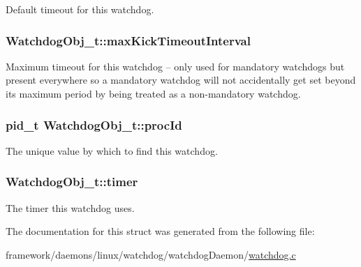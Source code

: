 Default timeout for this watchdog. 

\subsubsection[{\texorpdfstring{max\+Kick\+Timeout\+Interval}{maxKickTimeoutInterval}}]{ Watchdog\+Obj\+\_\+t\+::max\+Kick\+Timeout\+Interval}\hypertarget{struct_watchdog_obj__t_a29c8899fdeaff1aee8281bfc22765747}{}\label{struct_watchdog_obj__t_a29c8899fdeaff1aee8281bfc22765747}
Maximum timeout for this watchdog -- only used for mandatory watchdogs but present everywhere so a mandatory watchdog will not accidentally get set beyond it\textquotesingle{}s maximum period by being treated as a non-\/mandatory watchdog. 
\subsubsection[{\texorpdfstring{proc\+Id}{procId}}]{\setlength{\rightskip}{0pt plus 5cm}pid\+\_\+t Watchdog\+Obj\+\_\+t\+::proc\+Id}\hypertarget{struct_watchdog_obj__t_a7ca6476d7c613aca8eab52c2d3be863b}{}\label{struct_watchdog_obj__t_a7ca6476d7c613aca8eab52c2d3be863b}


The unique value by which to find this watchdog. 

\subsubsection[{\texorpdfstring{timer}{timer}}]{ Watchdog\+Obj\+\_\+t\+::timer}\hypertarget{struct_watchdog_obj__t_a2f104dbc15200e7cf8d09c892dcf1f09}{}\label{struct_watchdog_obj__t_a2f104dbc15200e7cf8d09c892dcf1f09}


The timer this watchdog uses. 



The documentation for this struct was generated from the following file\+:\begin{DoxyCompactItemize}
\item 
framework/daemons/linux/watchdog/watchdog\+Daemon/\hyperlink{watchdog_8c}{watchdog.\+c}\end{DoxyCompactItemize}
